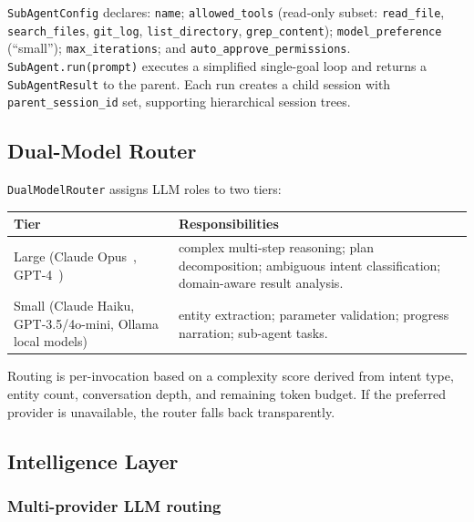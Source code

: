 \documentclass[11pt,a4paper]{article}
\begin{document}
\texttt{SubAgentConfig} declares: \texttt{name}; \texttt{allowed\_tools}
(read-only subset: \texttt{read\_file}, \texttt{search\_files}, \texttt{git\_log},
\texttt{list\_directory}, \texttt{grep\_content}); \texttt{model\_preference}
(``small''); \texttt{max\_iterations}; and \texttt{auto\_approve\_permissions}.
\texttt{SubAgent.run(prompt)} executes a simplified single-goal loop and returns
a \texttt{SubAgentResult} to the parent. Each run creates a child session with
\texttt{parent\_session\_id} set, supporting hierarchical session trees.

\subsection{Dual-Model Router}
\label{sec:proxima-dual-model}

\texttt{DualModelRouter} assigns LLM roles to two tiers:

\begin{center}
\small
\renewcommand{\arraystretch}{1.2}
\begin{tabular}{@{}lp{9cm}@{}}
\toprule
\textbf{Tier} & \textbf{Responsibilities} \\
\midrule
Large (Claude Opus~\cite{anthropic_claude}, GPT-4~\cite{openai_gpt4}) &
  complex multi-step reasoning; plan decomposition; ambiguous intent
  classification; domain-aware result analysis. \\
Small (Claude Haiku, GPT-3.5/4o-mini, Ollama~\cite{ollama} local models) &
  entity extraction; parameter validation; progress narration; sub-agent tasks. \\
\bottomrule
\end{tabular}
\end{center}

Routing is per-invocation based on a complexity score derived from intent type,
entity count, conversation depth, and remaining token budget. If the preferred
provider is unavailable, the router falls back transparently.

\subsection{Intelligence Layer}
\label{sec:proxima-intelligence}

\subsubsection*{Multi-provider LLM routing}
\end{document}
